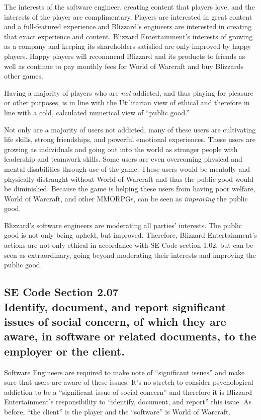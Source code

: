 \documentclass[11pt]{article}
\begin{document}
\begin{multicols}{2}
The interests of the software engineer, creating content that players love, and the interests of the player are complimentary. Players are interested in great content and a full-featured experience and Blizzard's engineers are interested in creating that exact experience and content.
Blizzard Entertainment's interests of growing as a company and keeping its shareholders satisfied are only improved by happy players. Happy players will recommend Blizzard and its products to friends as well as continue to pay monthly fees for World of Warcraft and buy Blizzards other games.

Having a majority of players who are \emph{not} addicted, and thus playing for pleasure or other purposes, is in line with the Utilitarian view of ethical and therefore in line with a cold, calculated numerical view of ``public good.''

Not only are a majority of users not addicted, many of these users are cultivating life skills, strong friendships, and powerful emotional experiences. These users are growing as individuals and going out into the world as stronger people with leadership and teamwork skills.
Some users are even overcoming physical and mental disabilities through use of the game. These users would be mentally and physically distraught without World of Warcraft and thus the public good would be diminished. Because the game is helping these users from having poor welfare, World of Warcraft, and other MMORPGs, can be seen as \emph{improving} the public good.

Blizzard's software engineers are moderating all parties' interests. The public good is not only being upheld, but improved. Therefore, Blizzard Entertainment's actions are not only ethical in accordance with SE Code section 1.02, but can be seen as extraordinary, going beyond moderating their interests and improving the public good.

\subsection{SE Code Section 2.07\\Identify, document, and report significant issues of social concern, of which they are aware, in software or related documents, to the employer or the client.}
Software Engineers are required to make note of ``significant issues'' and make sure that users are aware of these issues. It's no stretch to consider psychological addiction to be a ``significant issue of social concern'' and therefore it is Blizzard Entertainment's responsibility to ``identify, document, and report'' this issue. As before, ``the client'' is the player and the ``software'' is World of Warcraft.


\end{multicols}
\end{document}
